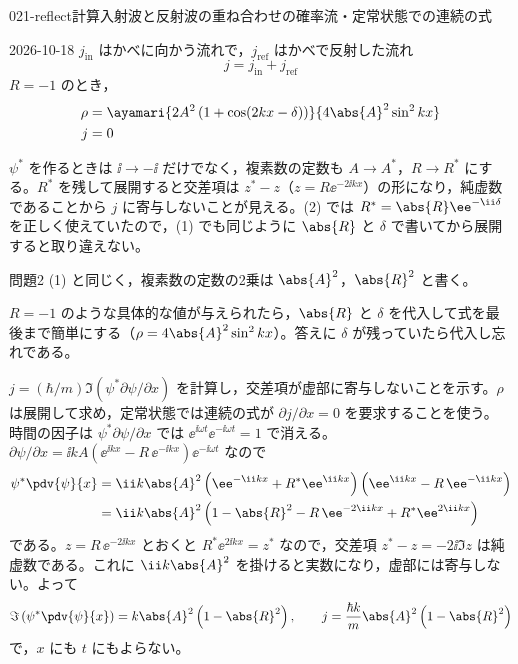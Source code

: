 \documentclass[uplatex,dvipdfmx,a4paper,11pt]{jsarticle}
\begin{document}
\begin{mondai}{021-reflect}{計算}{入射波と反射波の重ね合わせの確率流・定常状態での連続の式}
\begin{kotaeutsushi}{2026-10-18}
$j_{\mathrm{in}}$ はかべに向かう流れで，$j_{\mathrm{ref}}$ はかべで反射した流れ
\[ j=j_{\mathrm{in}}+j_{\mathrm{ref}} \]
$R=-1$ のとき，
\begin{align*}
\rho&=\ayamari{2A^{2}\left(1+\cos(2kx-\delta)\right)}{4\abs{A}^{2}\sin^{2}kx}\\
j&=0
\end{align*}
\end{kotaeutsushi}
\begin{kizuki}
\item $\psi^{*}$ を作るときは $\ii\to-\ii$ だけでなく，複素数の定数も $A\to A^{*}$，$R\to R^{*}$ にする。$R^{*}$ を残して展開すると交差項は $z^{*}-z$（$z=R\ee^{-2\ii kx}$）の形になり，純虚数であることから $j$ に寄与しないことが見える。(2) では $R^{*}=\abs{R}\ee^{-\ii\delta}$ を正しく使えていたので，(1) でも同じように $\abs{R}$ と $\delta$ で書いてから展開すると取り違えない。
\item 問題2 (1) と同じく，複素数の定数の2乗は $\abs{A}^{2}$，$\abs{R}^{2}$ と書く。
\item $R=-1$ のような具体的な値が与えられたら，$\abs{R}$ と $\delta$ を代入して式を最後まで簡単にする（$\rho=4\abs{A}^{2}\sin^{2}kx$）。答えに $\delta$ が残っていたら代入し忘れである。
\end{kizuki}
\begin{tadashii}
\houshin $j=(\hbar/m)\allowbreak\Im(\psi^{*}\partial\psi/\partial x)$ を計算し，交差項が虚部に寄与しないことを示す。$\rho$ は展開して求め，定常状態では連続の式が $\partial j/\partial x=0$ を要求することを使う。
\keisan {} 時間の因子は $\psi^{*}\partial\psi/\partial x$ では $\ee^{\ii\omega t}\ee^{-\ii\omega t}=1$ で消える。$\partial\psi/\partial x=\ii kA(\ee^{\ii kx}-R\,\ee^{-\ii kx})\ee^{-\ii\omega t}$ なので
\begin{align*}
  \psi^{*}\pdv{\psi}{x}
  &=\ii k\abs{A}^{2}\left(\ee^{-\ii kx}+R^{*}\ee^{\ii kx}\right)\left(\ee^{\ii kx}-R\,\ee^{-\ii kx}\right)\\
  &=\ii k\abs{A}^{2}\left(1-\abs{R}^{2}-R\,\ee^{-2\ii kx}+R^{*}\ee^{2\ii kx}\right)
\end{align*}
である。$z=R\,\ee^{-2\ii kx}$ とおくと $R^{*}\ee^{2\ii kx}=z^{*}$ なので，交差項 $z^{*}-z=-2\ii\Im z$ は純虚数である。これに $\ii k\abs{A}^{2}$ を掛けると実数になり，虚部には寄与しない。よって
\[
  \Im\left(\psi^{*}\pdv{\psi}{x}\right)=k\abs{A}^{2}\left(1-\abs{R}^{2}\right),\qquad
  j=\frac{\hbar k}{m}\abs{A}^{2}\left(1-\abs{R}^{2}\right)
\]
で，$x$ にも $t$ にもよらない。


\end{tadashii}
\end{mondai}
\end{document}
